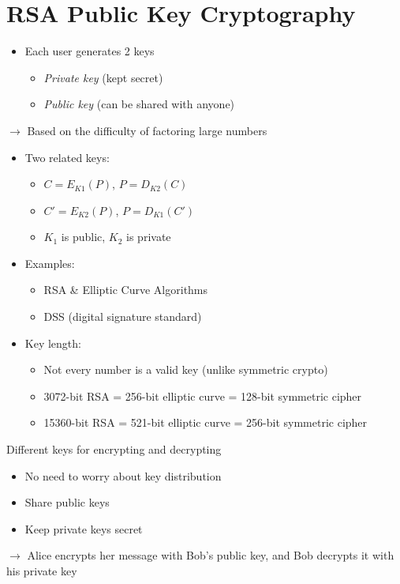 \documentclass{easyclass}
\begin{document}
\section{RSA Public Key Cryptography}
    \begin{itemize}
        \item Each user generates 2 keys
        \begin{itemize}
            \item \emph{Private key} (kept secret)
            \item \emph{Public key} (can be shared with anyone)
        \end{itemize}
    \end{itemize}
    $\rightarrow$ Based on the difficulty of factoring large numbers
    \begin{theo}{}
        \begin{itemize}
            \item Two related keys:
            \begin{itemize}
                \item $C = E_{K1}(P)$,  $P = D_{K2}(C)$
                \item $C' = E_{K2}(P)$,  $P = D_{K1}(C')$
                \item $K_1$ is public, $K_2$ is private
            \end{itemize}
            \item Examples:
            \begin{itemize}
                \item RSA \& Elliptic Curve Algorithms
                \item DSS (digital signature standard)
            \end{itemize}
            \item Key length:
            \begin{itemize}
                \item Not every number is a valid key (unlike symmetric crypto)
                \item 3072-bit RSA = 256-bit elliptic curve = 128-bit symmetric cipher
                \item 15360-bit RSA = 521-bit elliptic curve = 256-bit symmetric cipher
            \end{itemize}
        \end{itemize}

        Different keys for encrypting and decrypting
        \begin{itemize}
            \item No need to worry about key distribution
            \item Share public keys
            \item Keep private keys secret
        \end{itemize}
        $\rightarrow$ Alice encrypts her message with Bob's public key, and Bob 
        decrypts it with his private key
    \end{theo}
\end{document}
